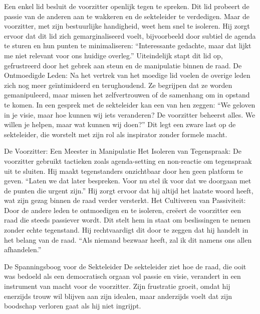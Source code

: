 Een enkel lid besluit de voorzitter openlijk tegen te spreken. Dit lid probeert de passie van de anderen aan te wakkeren en de sekteleider te verdedigen. Maar de voorzitter, met zijn bestuurlijke handigheid, weet hem snel te isoleren.
Hij zorgt ervoor dat dit lid zich gemarginaliseerd voelt, bijvoorbeeld door subtiel de agenda te sturen en hun punten te minimaliseren:
“Interessante gedachte, maar dat lijkt me niet relevant voor ons huidige overleg.”
Uiteindelijk stapt dit lid op, gefrustreerd door het gebrek aan steun en de manipulatie binnen de raad.
De Ontmoedigde Leden:
Na het vertrek van het moedige lid voelen de overige leden zich nog meer geïntimideerd en terughoudend. Ze begrijpen dat ze worden gemanipuleerd, maar missen het zelfvertrouwen of de samenhang om in opstand te komen.
In een gesprek met de sekteleider kan een van hen zeggen:
“We geloven in je visie, maar hoe kunnen wij iets veranderen? De voorzitter beheerst alles. We willen je helpen, maar wat kunnen wij doen?”
Dit legt een zware last op de sekteleider, die worstelt met zijn rol als inspirator zonder formele macht.

De Voorzitter: Een Meester in Manipulatie
Het Isoleren van Tegenspraak:
De voorzitter gebruikt tactieken zoals agenda-setting en non-reactie om tegenspraak uit te sluiten. Hij maakt tegenstanders onzichtbaar door hen geen platform te geven.
“Laten we dat later bespreken. Voor nu stel ik voor dat we doorgaan met de punten die urgent zijn.”
Hij zorgt ervoor dat hij altijd het laatste woord heeft, wat zijn gezag binnen de raad verder versterkt.
Het Cultiveren van Passiviteit:
Door de andere leden te ontmoedigen en te isoleren, creëert de voorzitter een raad die steeds passiever wordt. Dit stelt hem in staat om beslissingen te nemen zonder echte tegenstand. Hij rechtvaardigt dit door te zeggen dat hij handelt in het belang van de raad.
“Als niemand bezwaar heeft, zal ik dit namens ons allen afhandelen.”

De Spanningsboog voor de Sekteleider
De sekteleider ziet hoe de raad, die ooit was bedoeld als een democratisch orgaan vol passie en visie, verandert in een instrument van macht voor de voorzitter.
Zijn frustratie groeit, omdat hij enerzijds trouw wil blijven aan zijn idealen, maar anderzijds voelt dat zijn boodschap verloren gaat als hij niet ingrijpt.

